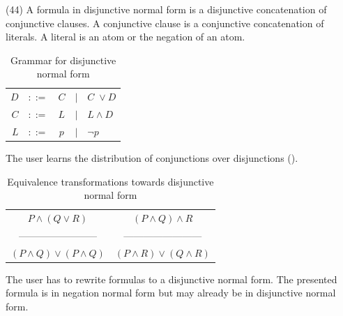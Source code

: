 (44) A formula in disjunctive normal form is a disjunctive concatenation of conjunctive clauses.
A conjunctive clause is a conjunctive concatenation of literals. 
A literal is an atom or the negation of an atom. 

\begin{table}[htdp]
\begin{center}
\begin{tabular}{rcccl}
$D$	&$::=$ & $C$ 	&$|$ & $C \;\vee D$\\
$C$	&$::=$ & $L$ 	&$|$ & $L \wedge D$\\
$L$	&$::=$ & $p$ 	&$|$ & $\neg p$
\end{tabular}
\caption{Grammar for disjunctive normal form}
\label{tab:DNF}
\end{center}
\end{table}

The user learns the distribution of conjunctions over disjunctions ().

\begin{table}[htdp]
\begin{center}
\begin{tabular}{cc}
$P \wedge (Q \vee R)$ 			& $(P \wedge Q) \wedge R$\\
———————— & ————————\\
$(P\wedge Q) \vee (P\wedge Q)$ 	& $(P\wedge R) \vee (Q\wedge R)$
\end{tabular}
\caption{Equivalence transformations towards disjunctive normal form}
\label{tab:ET_DNF}
\end{center}
\end{table}

The user has to rewrite formulas to a disjunctive normal form. 
The presented formula is in negation normal form 
but may already be in disjunctive normal form.

